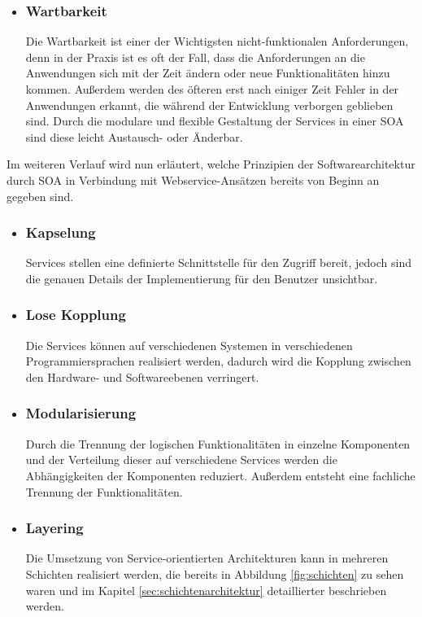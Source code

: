 \begin{itemize}
\item \subsubsection*{Wartbarkeit} 
Die Wartbarkeit ist einer der Wichtigsten nicht-funktionalen Anforderungen, denn in der Praxis ist es oft der Fall, dass die Anforderungen an die Anwendungen sich mit der Zeit ändern oder neue Funktionalitäten hinzu kommen. Außerdem werden des öfteren erst nach einiger Zeit Fehler in der Anwendungen erkannt, die während der Entwicklung verborgen geblieben sind. Durch die modulare und flexible Gestaltung der Services in einer \ac{SOA} sind diese leicht Austausch- oder Änderbar.
\end{itemize}

Im weiteren Verlauf wird nun erläutert, welche Prinzipien der Softwarearchitektur durch \ac{SOA} in Verbindung mit Webservice-Ansätzen bereits von Beginn an gegeben sind.

\begin{itemize}
\item \subsubsection*{Kapselung} 
Services stellen eine definierte Schnittstelle für den Zugriff bereit, jedoch sind die genauen Details der Implementierung für den Benutzer unsichtbar\autocite[Vgl.][13]{soamws}.
\item \subsubsection*{Lose Kopplung} 
Die Services können auf verschiedenen Systemen in verschiedenen Programmiersprachen realisiert werden, dadurch wird die Kopplung zwischen den Hardware- und Softwareebenen verringert.
\item \subsubsection*{Modularisierung} 
Durch die Trennung der logischen Funktionalitäten in einzelne Komponenten und der Verteilung dieser auf verschiedene Services werden die Abhängigkeiten der Komponenten reduziert. Außerdem entsteht eine fachliche Trennung der Funktionalitäten. 
\item \subsubsection*{Layering} Die Umsetzung von Service-orientierten Architekturen kann in mehreren \\Schichten realisiert werden, die bereits in Abbildung \ref{fig:schichten} zu sehen waren und im Kapitel \ref{sec:schichtenarchitektur} detaillierter beschrieben werden.
\end{itemize}

